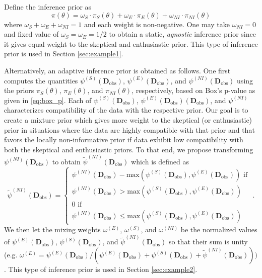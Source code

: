 \documentclass[useAMS,usenatbib,referee]{biom}
\begin{document}
{
Define the inference prior as
\begin{equation}\label{eq:3partmix}
\pi(\theta)=\omega_S\cdot \pi_S(\theta)+\omega_E\cdot\pi_E(\theta)+\omega_{NI}\cdot\pi_{NI}(\theta)
\end{equation}
where $\omega_S+\omega_E+\omega_{NI}=1$ and each weight is non-negative. 
One may take $\omega_{NI}=0$ and fixed value of $\omega_S=\omega_E=1/2$ to obtain a static, \textit{agnostic} inference prior since it 
gives equal weight to the skeptical and enthusiastic prior.
%
This type of inference prior is used in Section \ref{sec:example1}.
}

{
Alternatively, an adaptive inference prior is obtained as follows.
One first computes the quantities $\psi^{(S)}(\mathbf{D}_{\text{obs}})$, $\psi^{(E)}(\mathbf{D}_{\text{obs}})$, and $\psi^{(NI)}(\mathbf{D}_{\text{obs}})$ using the priors $\pi_S(\theta)$, 
$\pi_E(\theta)$, and $\pi_{NI}(\theta)$, respectively, based on Box's p-value as given in \eqref{eq:box_p}. 
Each of $\psi^{(S)}(\mathbf{D}_{\text{obs}})$, $\psi^{(E)}(\mathbf{D}_{\text{obs}})(\mathbf{D}_{\text{obs}})$, and $\psi^{(NI)}$ characterizes compatibility of the data with the respective prior.
Our goal is to create a mixture prior which gives more weight to the skeptical (or enthusiastic) prior in situations where the data are highly compatible 
with that prior and that favors the locally non-informative prior if data exhibit low compatibility with both the skeptical and enthusiastic priors.
 To that end, we propose transforming $\psi^{(NI)}(\mathbf{D}_{\text{obs}})$ to obtain $\tilde{\psi}^{(NI)}(\mathbf{D}_{\text{obs}})$ which is defined as
\begin{equation}\label{eq:3partmix_ni}
\tilde{\psi}^{(NI)}(\mathbf{D}_{\text{obs}})=
\begin{cases} 
      \psi^{(NI)}(\mathbf{D}_{\text{obs}})-\text{max}(\psi^{(S)}(\mathbf{D}_{\text{obs}}),\psi^{(E)}(\mathbf{D}_{\text{obs}})) \text{ if }\\ \psi^{(NI)}(\mathbf{D}_{\text{obs}})>\text{max}(\psi^{(S)}(\mathbf{D}_{\text{obs}}),\psi^{(E)}(\mathbf{D}_{\text{obs}}))\\
      0 \text{ if } \\\psi^{(NI)}(\mathbf{D}_{\text{obs}})\leq\text{max}(\psi^{(S)}(\mathbf{D}_{\text{obs}}),\psi^{(E)}(\mathbf{D}_{\text{obs}}))
   \end{cases}.
\end{equation}	
We then let the mixing weights $\omega^{(E)}$, $\omega^{(S)}$, and $\omega^{(NI)}$ be the normalized values of $\psi^{(E)}(\mathbf{D}_{\text{obs}})$, $\psi^{(S)}(\mathbf{D}_{\text{obs}})$, and $\tilde{\psi}^{(NI)}(\mathbf{D}_{\text{obs}})$ so that their sum is unity (e.g. $\omega^{(E)}=\psi^{(E)}(\mathbf{D}_{\text{obs}})/(\psi^{(E)}(\mathbf{D}_{\text{obs}})+\psi^{(S)}(\mathbf{D}_{\text{obs}})+\tilde{\psi}^{(NI)}(\mathbf{D}_{\text{obs}})))$.
This type of inference prior is used in Section \ref{sec:example2}.
}
\end{document}
